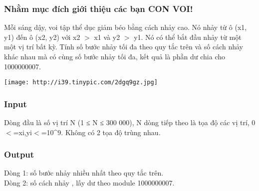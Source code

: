 







\subsubsection{   Nhằm mục đích giới thiệu các bạn CON VOI!  }

   Mỗi sáng dậy, voi tập thể dục giảm béo bằng cách nhảy cao. Nó nhảy từ ô (x1, y1) đến ô (x2, y2) với x2 $>$ x1 và y2 $>$ y1. Nó có thể bắt đầu nhảy từ một một vị trí bất kỳ. Tính số bước nhảy tối đa theo quy tắc trên và số cách nhảy khác nhau mà có cùng số bước nhảy tối đa, kết quả là phần dư chia cho 1000000007.  

\href{http://tinypic.com}{}


\texttt{[image: http://i39.tinypic.com/2dgq9gz.jpg]}

\subsubsection{   Input  }

   Dòng đầu là số vị trí N (1 ≤ N ≤ 300 000), N dòng tiếp theo là tọa độ các vị trí, 0 $<$=xi,yi$<$=10\textasciicircum9. Không có 2 tọa độ trùng nhau.  

\subsubsection{   Output  }

   Dòng 1: số bước nhảy nhiều nhất theo quy tắc trên.   
\\   Dòng 2: số cách nhảy , lấy dư theo module 1000000007.  

